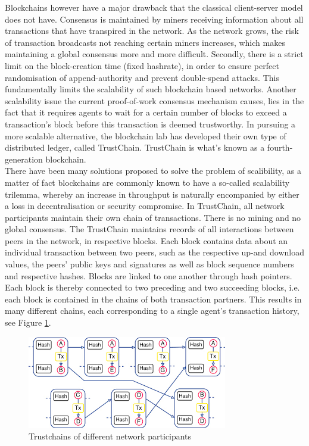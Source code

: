 \documentclass[11pt,a4paper]{report}
\theoremstyle{definition}
\theoremstyle{theorem}
\theoremstyle{proposition}
\theoremstyle{corollary}
\theoremstyle{lemma}
\theoremstyle{example}
\theoremstyle{remark}
\begin{document}
\noindent{}Blockchains however have a major drawback that the classical client-server model does not have. Consensus is maintained by miners receiving information about all transactions that have transpired in the network. As the network grows, the risk of transaction broadcasts not reaching certain miners increases, which makes maintaining a global consensus more and more difficult. Secondly, there is a strict limit on the block-creation time (fixed hashrate), in order to ensure perfect randomisation of append-authority and prevent double-spend attacks. This fundamentally limits the scalability of such blockchain based networks. Another scalability issue the current proof-of-work consensus mechanism causes, lies in the fact that it requires agents to wait for a certain number of blocks to exceed a transaction's block before this transaction is deemed trustworthy. In pursuing a more scalable alternative, the blockchain lab has developed their own type of distributed ledger, called TrustChain. TrustChain is what's known as a fourth-generation blockchain. \vspace{1em}\\

\noindent{}There have been many solutions proposed to solve the problem of scalibility, as a matter of fact blockchains are commonly known to have a so-called scalability trilemma, whereby an increase in throughput is naturally encompanied by either a loss in decentralisation or security compromise. In TrustChain, all network participants maintain their own chain of transactions. There is no mining and no global consensus. The TrustChain maintains records of all interactions between peers in the network, in respective blocks. Each block contains data about an individual transaction between two peers, such as the respective up-and download values, the peers' public keys and signatures as well as block sequence numbers and respective hashes. Blocks are linked to one another through hash pointers. Each block is thereby connected to two preceding and two succeeding blocks, i.e. each block is contained in the chains of both transaction partners. This results in many different chains, each corresponding to a single agent's transaction history, see Figure \ref{fig:Trustchain}\cite{TrustChain: A Sybil-resistant scalable blockchain}. \vspace{1em}\\

\begin{figure}[H]
\begin{center}
\includegraphics[scale=0.6]{Trustchain.png}
\caption{Trustchains of different network participants}
\label{fig:Trustchain}
\end{center}
\end{figure} 
\end{document}
